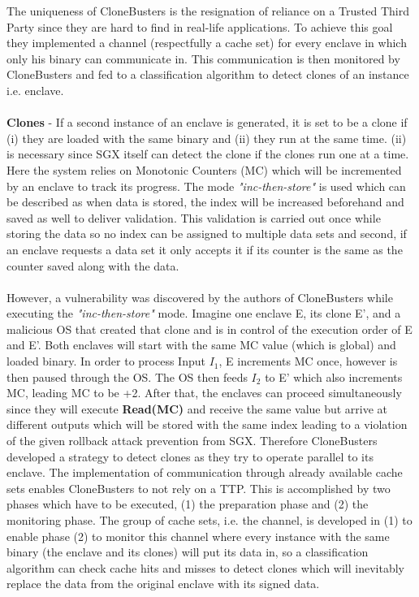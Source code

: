 The uniqueness of CloneBusters is the resignation of reliance on a Trusted Third Party since they are hard to find in real-life applications. To achieve this goal they implemented a channel (respectfully a cache set) for every enclave in which only his binary can communicate in. This communication is then monitored by CloneBusters and fed to a classification algorithm to detect clones of an instance i.e. enclave. \\
\\
\textbf{Clones} - If a second instance of an enclave is generated, it is set to be a clone if (i) they are loaded with the same binary and (ii) they run at the same time. (ii) is necessary since SGX itself can detect the clone if the clones run one at a time. Here the system relies on Monotonic Counters (MC) which will be incremented by an enclave to track its progress. The mode \textit{"inc-then-store"} is used which can be described as when data is stored, the index will be increased beforehand and saved as well to deliver validation. This validation is carried out once while storing the data so no index can be assigned to multiple data sets and second, if an enclave requests a data set it only accepts it if its counter is the same as the counter saved along with the data.
\\
\\
However, a vulnerability was discovered by the authors of CloneBusters while executing the \textit{"inc-then-store"} mode. Imagine one enclave E, its clone E', and a malicious OS that created that clone and is in control of the execution order of E and E'. Both enclaves will start with the same MC value (which is global) and loaded binary. In order to process Input \(I_1\), E increments MC once, however is then paused through the OS. The OS then feeds \(I_2\) to E' which also increments MC, leading MC to be +2. After that, the enclaves can proceed simultaneously since they will execute \textbf{Read(MC)} and receive the same value but arrive at different outputs which will be stored with the same index leading to a violation of the given rollback attack prevention from SGX. Therefore CloneBusters developed a strategy to detect clones as they try to operate parallel to its enclave. The implementation of communication through already available cache sets enables CloneBusters to not rely on a TTP. This is accomplished by two phases which have to be executed, (1) the preparation phase and (2) the monitoring phase. The group of cache sets, i.e. the channel, is developed in (1) to enable phase (2) to monitor this channel where every instance with the same binary (the enclave and its clones) will put its data in, so a classification algorithm can check cache hits and misses to detect clones which will inevitably replace the data from the original enclave with its signed data.

